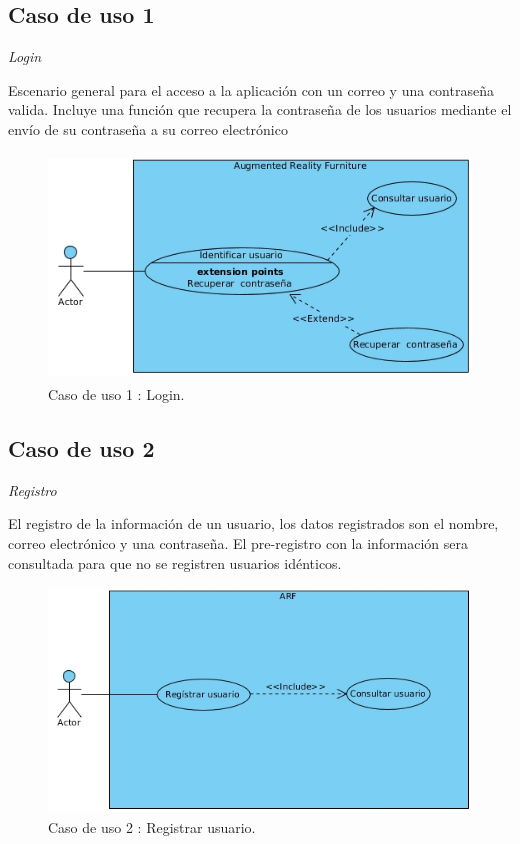 \subsection{Caso de uso 1} \textit{Login}\par
Escenario general para el acceso a la aplicación con un correo y una contraseña valida. Incluye una función que recupera la contraseña de los usuarios mediante el envío de su contraseña a su correo electrónico
\begin{figure}[h!]
	\centering
	\includegraphics[width=12cm,height=6cm]{imagenes/analisis/login.jpg}
	\caption{Caso de uso 1 : Login.}
	
	\label{fig:analogo}
\end{figure}  
\subsection{Caso de uso 2} \textit{Registro} \par
	El registro de la información de un usuario, los datos registrados son el nombre, correo electrónico y una contraseña. El pre-registro con la información sera consultada para que no se registren usuarios idénticos.
\begin{figure}[h!]
	\centering
	\includegraphics[width=12cm,height=6cm]{imagenes/analisis/registrarUsuario.jpg}
	\caption{Caso de uso 2 : Registrar usuario.}
	\label{fig:analogo}
\end{figure} 
\newpage
